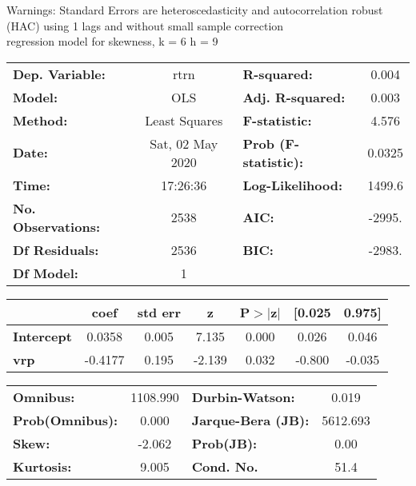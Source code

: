 Warnings: \newline
 [1] Standard Errors are heteroscedasticity and autocorrelation robust (HAC) using 1 lags and without small sample correction\\ 

regression model for skewness, k = 6 h = 9\begin{center}
\begin{tabular}{lclc}
\toprule
\textbf{Dep. Variable:}    &       rtrn       & \textbf{  R-squared:         } &     0.004   \\
\textbf{Model:}            &       OLS        & \textbf{  Adj. R-squared:    } &     0.003   \\
\textbf{Method:}           &  Least Squares   & \textbf{  F-statistic:       } &     4.576   \\
\textbf{Date:}             & Sat, 02 May 2020 & \textbf{  Prob (F-statistic):} &   0.0325    \\
\textbf{Time:}             &     17:26:36     & \textbf{  Log-Likelihood:    } &    1499.6   \\
\textbf{No. Observations:} &        2538      & \textbf{  AIC:               } &    -2995.   \\
\textbf{Df Residuals:}     &        2536      & \textbf{  BIC:               } &    -2983.   \\
\textbf{Df Model:}         &           1      & \textbf{                     } &             \\
\bottomrule
\end{tabular}
\begin{tabular}{lcccccc}
                   & \textbf{coef} & \textbf{std err} & \textbf{z} & \textbf{P$> |$z$|$} & \textbf{[0.025} & \textbf{0.975]}  \\
\midrule
\textbf{Intercept} &       0.0358  &        0.005     &     7.135  &         0.000        &        0.026    &        0.046     \\
\textbf{vrp}       &      -0.4177  &        0.195     &    -2.139  &         0.032        &       -0.800    &       -0.035     \\
\bottomrule
\end{tabular}
\begin{tabular}{lclc}
\textbf{Omnibus:}       & 1108.990 & \textbf{  Durbin-Watson:     } &    0.019  \\
\textbf{Prob(Omnibus):} &   0.000  & \textbf{  Jarque-Bera (JB):  } & 5612.693  \\
\textbf{Skew:}          &  -2.062  & \textbf{  Prob(JB):          } &     0.00  \\
\textbf{Kurtosis:}      &   9.005  & \textbf{  Cond. No.          } &     51.4  \\
\bottomrule
\end{tabular}
\end{center}

